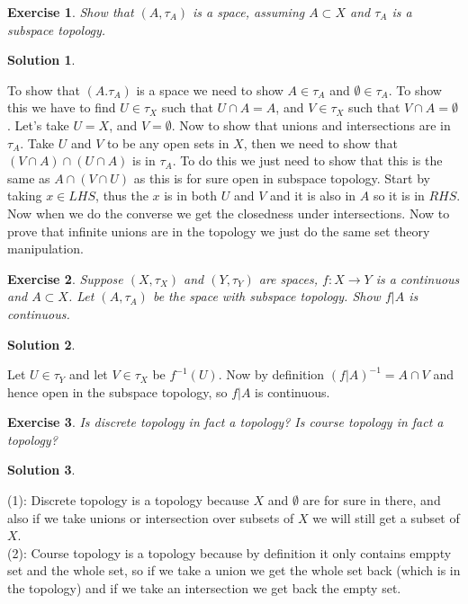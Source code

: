 \documentclass[11pt,a4paper]{article}
\newtheorem{Ex}{Exercise}
\newtheorem{Sol}{Solution}
\begin{document}
\begin{Ex}
	Show that $(A, \tau_A)$ is a space, assuming $A \subset X$ and $\tau_A$ is a subspace topology.
\end{Ex}

\begin{Sol} \end{Sol}
\noindent To show that $(A. \tau_A)$ is a space we need to show $A \in \tau_A$ and $\emptyset \in \tau_A$. To show this we have to find $U \in \tau_X$ such that $U \cap A = A$, and $V \in \tau_X$ such that $V \cap A = \emptyset$. Let's take $U = X$, and $V = \emptyset$. Now to show that unions and intersections are in $\tau_A$. Take $U$ and $V$ to be any open sets in $X$, then we need to show that $(V \cap A)\cap (U \cap A)$ is in $\tau_A$. To do this we just need to show that this is the same as $A \cap (V \cap U)$ as this is for sure open in subspace topology. Start by taking $x \in LHS$, thus the $x$ is in both $U$ and $V$ and it is also in $A$ so it is in $RHS$. Now when we do the converse we get the closedness under intersections. Now to prove that infinite unions are in the topology we just do the same set theory manipulation.  
\begin{Ex}
	Suppose $(X, \tau_X)$ and $(Y, \tau_Y)$ are spaces, $f: X \rightarrow Y$ is a continuous and $A \subset X$. Let $(A, \tau_A)$ be the space with subspace topology. Show $f|A$ is continuous. 
\end{Ex}

\begin{Sol} \end{Sol}
\noindent Let $U \in \tau_Y$ and let $V \in \tau_X$ be $f^{-1}(U)$. Now by definition $(f|A)^{-1} = A \cap V$ and hence open in the subspace topology, so $f|A$ is continuous.

\begin{Ex}
	Is discrete topology in fact a topology? Is course topology in fact a topology?
\end{Ex}

\begin{Sol} \end{Sol}
\noindent (1): Discrete topology is a topology because $X$ and $\emptyset$ are for sure in there, and also if we take unions or intersection over subsets of $X$ we will still get a subset of $X$. \\
\noindent (2): Course topology is a topology because by definition it only contains emppty set and the whole set, so if we take a union we get the whole set back (which is in the topology) and if we take an intersection we get back the empty set. 
\end{document}
